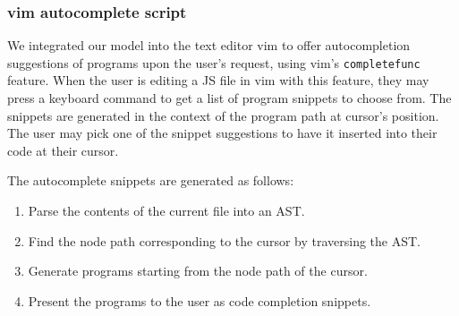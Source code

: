 \documentclass{article}
\begin{document}
\subsubsection{vim autocomplete script}

We integrated our model into the text editor vim to offer autocompletion
suggestions of programs upon the user's request, using vim's
\texttt{completefunc} feature. When the user is editing a JS file in vim with
this feature, they may press a keyboard command to get a list of program
snippets to choose from. The snippets are generated in the context of the
program path at cursor's position. The user may pick one of the snippet
suggestions to have it inserted into their code at their cursor.

The autocomplete snippets are generated as follows:
\begin{enumerate}
	\item Parse the contents of the current file into an AST.
	\item Find the node path corresponding to the cursor by traversing the AST.
	\item Generate programs starting from the node path of the cursor.
	\item Present the programs to the user as code completion snippets.
\end{enumerate}
\end{document}
